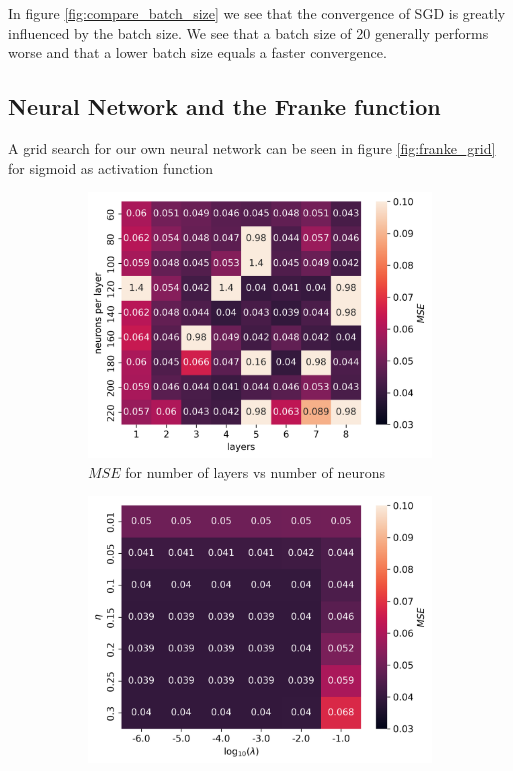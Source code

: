\documentclass[11pt]{article}
\begin{document}
In figure \ref{fig:compare_batch_size} we see that the convergence of SGD is greatly influenced by the batch size. We see that a batch size of 20 generally performs worse and that a lower batch size equals a faster convergence.

\subsection{Neural Network and the Franke function}
A grid search for our own neural network can be seen in figure \ref{fig:franke_grid} for sigmoid as activation function
\begin{figure}[H]
    \begin{subfigure}{.5\textwidth}
        \centering
        \includegraphics[width=\textwidth]{../figures/franke_L_n_test_sigmoid.png}
        \caption{$MSE$ for number of layers vs number of neurons}
        \label{fig:}
    \end{subfigure}
    \begin{subfigure}{.5\textwidth}
        \centering
        \includegraphics[width=\textwidth]{../figures/franke_eta_lmb_sigmoid.png}

\end{subfigure}
\end{figure}
\end{document}
